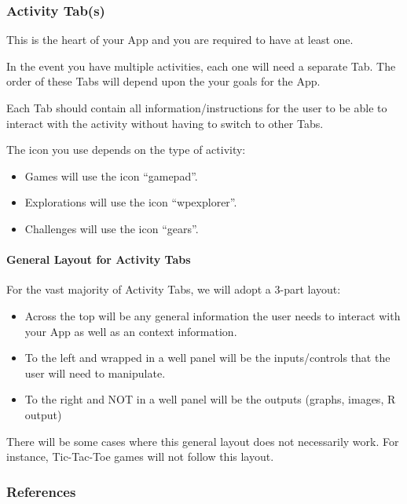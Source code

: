\documentclass[
]{book}
\providecommand{\tightlist}{%
  \setlength{\itemsep}{0pt}\setlength{\parskip}{0pt}}
\begin{document}
\hypertarget{activity-tabs}{%
\subsubsection{Activity Tab(s)}\label{activity-tabs}}

This is the heart of your App and you are required to have at least one.

In the event you have multiple activities, each one will need a separate Tab. The order of these Tabs will depend upon the your goals for the App.

Each Tab should contain all information/instructions for the user to be able to interact with the activity without having to switch to other Tabs.

The icon you use depends on the type of activity:

\begin{itemize}
\tightlist
\item
  Games will use the icon ``gamepad''.
\item
  Explorations will use the icon ``wpexplorer''.
\item
  Challenges will use the icon ``gears''.
\end{itemize}

\hypertarget{general-layout-for-activity-tabs}{%
\paragraph{General Layout for Activity Tabs}\label{general-layout-for-activity-tabs}}

For the vast majority of Activity Tabs, we will adopt a 3-part layout:

\begin{itemize}
\tightlist
\item
  Across the top will be any general information the user needs to interact with your App as well as an context information.
\item
  To the left and wrapped in a well panel will be the inputs/controls that the user will need to manipulate.
\item
  To the right and NOT in a well panel will be the outputs (graphs, images, R output)
\end{itemize}

There will be some cases where this general layout does not necessarily work. For instance, Tic-Tac-Toe games will not follow this layout.

\hypertarget{references}{%
\subsubsection{References}\label{references}}
\end{document}
